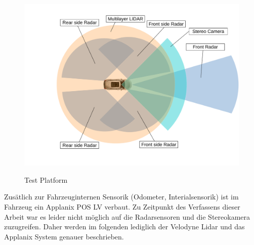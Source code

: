 \begin{figure}[!ht]
\caption{Test Platform}
\includegraphics[width=\columnwidth]{sensors.pdf}
\label{platform}
\end{figure}


Zusätlich zur Fahrzeuginternen Sensorik (Odometer, Interialsensorik) ist im Fahrzeug ein Applanix POS LV verbaut. Zu Zeitpunkt des Verfassens dieser Arbeit war es leider nicht möglich auf
die Radarsensoren und die Stereokamera zuzugreifen. Daher werden im folgenden lediglich der Velodyne Lidar und das Applanix System genauer beschrieben.

